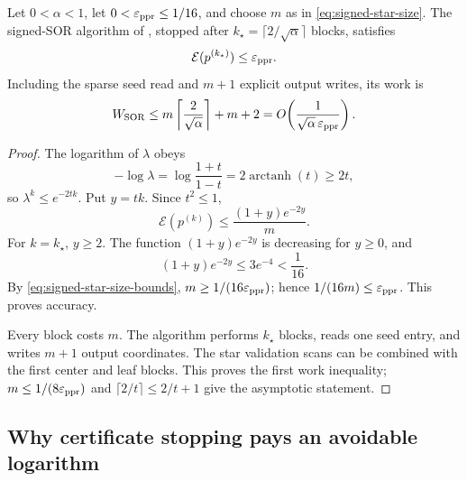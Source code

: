 \begin{theorem}
\label{thm:signed-star-semantic-upper}
Let $0<\alpha<1$, let
$0<\varepsilon_{\rm ppr}\le1/16$, and choose $m$ as in
\eqref{eq:signed-star-size}.  The signed-SOR algorithm of
, stopped after
$k_\star=\lceil2/\sqrt\alpha\rceil$ blocks, satisfies
\begin{equation}
  \mathcal E(p^{(k_\star)})\le\varepsilon_{\rm ppr}.
  \label{eq:signed-star-upper-accuracy}
\end{equation}
Including the sparse seed read and $m+1$ explicit output writes, its work is
\begin{equation}
  W_{\rm SOR}
  \le m\left\lceil\frac{2}{\sqrt\alpha}\right\rceil+m+2
  =O\!\left(
      \frac{1}{\sqrt\alpha\,\varepsilon_{\rm ppr}}
    \right).
  \label{eq:signed-star-upper-work}
\end{equation}
\end{theorem}

\begin{proof}
The logarithm of $\lambda$ obeys
\begin{equation}
  -\log\lambda
  =\log\frac{1+t}{1-t}
  =2\operatorname{arctanh}(t)
  \ge2t,
  \label{eq:signed-star-lambda-exponential}
\end{equation}
so $\lambda^k\le e^{-2tk}$.  Put $y=tk$.  Since $t^2\le1$,
\begin{equation}
  \mathcal E(p^{(k)})
  \le\frac{(1+y)e^{-2y}}{m}.
  \label{eq:signed-star-error-envelope}
\end{equation}
For $k=k_\star$, $y\ge2$.  The function $(1+y)e^{-2y}$ is decreasing for
$y\ge0$, and
\begin{equation}
  (1+y)e^{-2y}\le3e^{-4}<\frac1{16}.
  \label{eq:signed-star-numerical-constant}
\end{equation}
By \eqref{eq:signed-star-size-bounds}, $m\ge1/(16\varepsilon_{\rm ppr})$;
hence $1/(16m)\le\varepsilon_{\rm ppr}$.  This proves accuracy.

Every block costs $m$.  The algorithm performs $k_\star$ blocks, reads one
seed entry, and writes $m+1$ output coordinates.  The star validation scans
can be combined with the first center and leaf blocks.  This proves the first
work inequality; $m\le1/(8\varepsilon_{\rm ppr})$ and
$\lceil2/t\rceil\le2/t+1$ give the asymptotic statement.
\end{proof}

\subsection{Why certificate stopping pays an avoidable logarithm}

